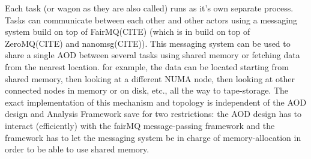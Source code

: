 \documentclass[a4paper]{report}
\begin{document}
 \par Each task (or wagon as they are also called) runs as it's own separate process.
 Tasks can communicate between each other and other actors using a messaging system build on top of FairMQ(CITE) (which is in build on top of ZeroMQ(CITE) and nanomsg(CITE)).
 This messaging system can be used to share a single AOD between several tasks using shared memory or fetching data from the nearest location. for example,
 the data can be located starting from shared memory, then looking at a different NUMA node, then looking at other connected nodes in memory or on disk, etc.,
 all the way to tape-storage. The exact implementation of this mechanism and topology is independent of the AOD design and Analysis Framework save for two restrictions:
 the AOD design has to interact (efficiently) with the fairMQ message-passing framework and the framework
 has to let the messaging system be in charge of memory-allocation in order to be able to use shared memory.
\end{document}
